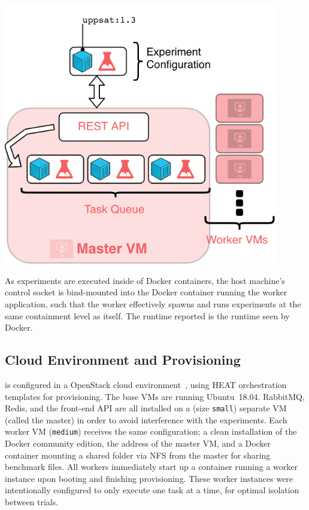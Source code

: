 \documentclass[a4paper]{IEEEtran}
\begin{document}
\begin{Figure}
  \centering
  \includegraphics[width=0.9\textwidth]{architecture}
  \label{fig:architecture}
\end{Figure}

As experiments are executed inside of Docker containers, the host machine's
control socket is bind-mounted into the Docker container running the worker
application, such that the worker effectively spawns and runs experiments at the
same containment level as itself. The runtime reported is the runtime seen by
Docker.

\subsection{Cloud Environment and Provisioning}

\testbench{} is configured in a OpenStack cloud environment~\cite{openstack},
using HEAT orchestration templates for provisioning. The base VMs are running
Ubuntu~18.04. RabbitMQ, Redis, and the front-end API are all installed
on a (size \texttt{small}) separate VM (called the master) in order to avoid
interference with the experiments. Each worker VM (\texttt{medium}) receives the
same configuration; a clean installation of the Docker community edition, the
address of the master VM, and a Docker container mounting a shared folder via
NFS from the master for sharing benchmark files. All workers immediately start
up a container running a worker instance upon booting and finishing
provisioning. These worker instances were intentionally configured to only
execute one task at a time, for optimal isolation between trials.
\end{document}
